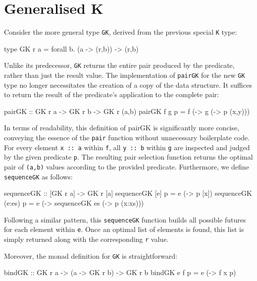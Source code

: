 \documentclass[runningheads]{llncs}
\begin{document}
\section{Generalised K}\label{generalised-k}

Consider the more general type \texttt{GK}, derived from the previous
special \texttt{K} type:

\begin{code}
type GK r a = forall b. (a -> (r,b)) -> (r,b)
\end{code}

Unlike its predecessor, \texttt{GK} returns the entire pair produced by
the predicate, rather than just the result value. The implementation of
\texttt{pairGK} for the new \texttt{GK} type no longer necessitates the
creation of a copy of the data structure. It suffices to return the
result of the predicate's application to the complete pair:

\begin{code}
pairGK :: GK r a -> GK r b -> GK r (a,b)
pairGK f g p = f (\x -> g (\y -> p (x,y)))
\end{code}

In terms of readability, this definition of pairGK is significantly more
concise, conveying the essence of the \texttt{pair} function without
unnecessary boilerplate code. For every element \texttt{x\ ::\ a} within
\texttt{f}, all \texttt{y\ ::\ b} within \texttt{g} are inspected and
judged by the given predicate \texttt{p}. The resulting pair selection
function returns the optimal pair of \texttt{(a,b)} values according to
the provided predicate. Furthermore, we define \texttt{sequenceGK} as
follows:

\begin{code}
sequenceGK :: [GK r a] -> GK r [a]
sequenceGK [e] p    = e (\x -> p [x])
sequenceGK (e:es) p = e (\x -> sequenceGK es (\xs -> p (x:xs)))
\end{code}

Following a similar pattern, this \texttt{sequenceGK} function builds
all possible futures for each element within \texttt{e}. Once an optimal
list of elements is found, this list is simply returned along with the
corresponding \texttt{r} value.

Moreover, the monad definition for \texttt{GK} is straightforward:

\begin{code}
bindGK :: GK r a -> (a -> GK r b) -> GK r b
bindGK e f p = e (\x -> f x p)
\end{code}
\end{document}
